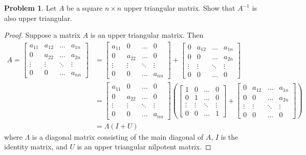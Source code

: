 \documentclass[12pt]{article}
\theoremstyle{definition}
\newtheorem{problem}{Problem}
\begin{document}
\begin{problem}
  Let $A$ be a square $n \times n$ upper triangular matrix. Show that
  $A^{-1}$ is also upper triangular.
\end{problem}

\begin{proof}
  Suppose a matrix $A$ is an upper triangular matrix. Then
  \begin{align*}
    A =
    \begin{bmatrix}
      a_{11} & a_{12} & \dots & a_{1n} \\
      0 & a_{22} & \dots & a_{2n} \\
      \vdots & \vdots & \ddots & \vdots \\
      0 & 0 & \dots & a_{nn}
    \end{bmatrix}
    &=
    \begin{bmatrix}
      a_{11} & 0 & \dots & 0 \\
      0 & a_{22} & \dots & 0 \\
      \vdots & \vdots & \ddots & \vdots \\
      0 & 0 & \dots & a_{nn}
    \end{bmatrix}
    +
    \begin{bmatrix}
      0 & a_{12} & \dots & a_{1n} \\
      0 & 0 & \dots & a_{2n} \\
      \vdots & \vdots & \ddots & \vdots \\
      0 & 0 & \dots & 0
    \end{bmatrix}\\
    &=
    \begin{bmatrix}
      a_{11} & 0 & \dots & 0 \\
      0 & a_{22} & \dots & 0 \\
      \vdots & \vdots & \ddots & \vdots \\
      0 & 0 & \dots & a_{nn}
    \end{bmatrix}
    \left(
      \begin{bmatrix}
        1 & 0 & \dots & 0 \\
        0 & 1 & \dots & 0 \\
        \vdots & \vdots & \ddots & \vdots \\
        0 & 0 & \dots & 1
      \end{bmatrix}
      +
      \begin{bmatrix}
        0 & a_{12} & \dots & a_{1n} \\
        0 & 0 & \dots & a_{2n} \\
        \vdots & \vdots & \ddots & \vdots \\
        0 & 0 & \dots & 0
      \end{bmatrix}
    \right)\\
    &=
    \Lambda (I + U)
  \end{align*}
  where $\Lambda$ is a diagonal matrix consisting of the main diagonal of $A$,
  $I$ is the identity matrix, and $U$ is an upper triangular nilpotent matrix.


\end{proof}
\end{document}
